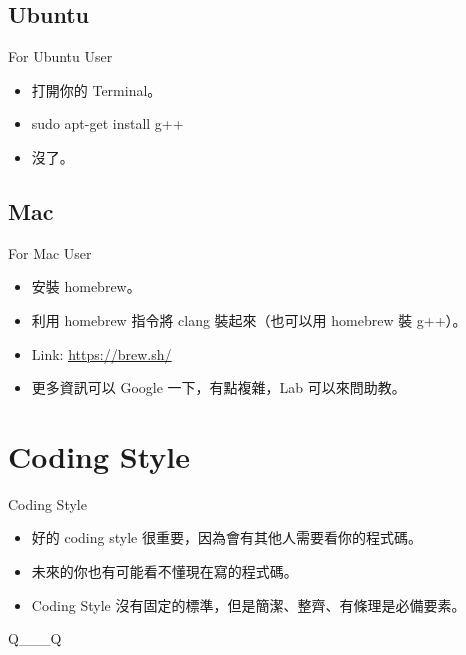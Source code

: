 \documentclass[t]{beamer}
\begin{document}
\subsection{Ubuntu}
\begin{frame}{For Ubuntu User}
  \begin{itemize}
    \item 打開你的 Terminal。
    \item sudo apt-get install g++
    \item 沒了。
  \end{itemize}
\end{frame}

\subsection{Mac}
\begin{frame}{For Mac User}
  \begin{itemize}
    \item 安裝 homebrew。
    \item 利用 homebrew 指令將 clang 裝起來（也可以用 homebrew 裝 g++）。
    \item Link: \href{https://brew.sh/}{\underline{https://brew.sh/}}
    \item 更多資訊可以 Google 一下，有點複雜，Lab 可以來問助教。
  \end{itemize}
\end{frame}

\section{Coding Style}
\begin{frame}{Coding Style}
  \begin{itemize}
    \item 好的 coding style 很重要，因為會有其他人需要看你的程式碼。
    \item 未來的你也有可能看不懂現在寫的程式碼。
    \item Coding Style 沒有固定的標準，但是簡潔、整齊、有條理是必備要素。
  \end{itemize}
\end{frame}

\begin{frame}{Q\_\_\_Q}
  \begin{minipage}[t]{.40\textwidth}
    
  \end{minipage}
  \begin{minipage}[t]{.40\textwidth}
    
  \end{minipage}
\end{frame}
\end{document}
